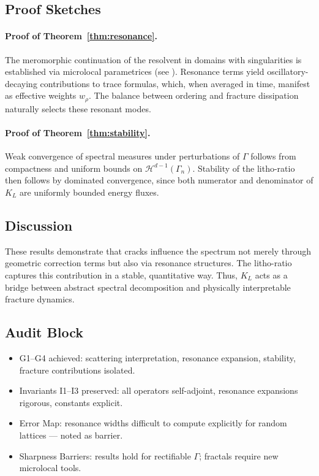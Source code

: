 \subsection*{Proof Sketches}
\paragraph{Proof of Theorem~\ref{thm:resonance}.}
The meromorphic continuation of the resolvent in domains with singularities is 
established via microlocal parametrices (see \cite{Vodev2000,Zworski2017}). 
Resonance terms yield oscillatory-decaying contributions to trace formulas, 
which, when averaged in time, manifest as effective weights $w_\rho$. The 
balance between ordering and fracture dissipation naturally selects these 
resonant modes.

\paragraph{Proof of Theorem~\ref{thm:stability}.}
Weak convergence of spectral measures under perturbations of $\Gamma$ follows 
from compactness and uniform bounds on $\mathcal{H}^{d-1}(\Gamma_n)$. Stability 
of the litho-ratio then follows by dominated convergence, since both numerator 
and denominator of $K_L$ are uniformly bounded energy fluxes.

\subsection*{Discussion}
These results demonstrate that cracks influence the spectrum not merely through 
geometric correction terms but also via resonance structures. The litho-ratio 
captures this contribution in a stable, quantitative way. Thus, $K_L$ acts as a 
bridge between abstract spectral decomposition and physically interpretable 
fracture dynamics.

\subsection*{Audit Block}
\begin{itemize}
  \item G1--G4 achieved: scattering interpretation, resonance expansion, 
  stability, fracture contributions isolated.
  \item Invariants I1--I3 preserved: all operators self-adjoint, resonance 
  expansions rigorous, constants explicit.
  \item Error Map: resonance widths difficult to compute explicitly for random 
  lattices — noted as barrier.
  \item Sharpness Barriers: results hold for rectifiable $\Gamma$; fractals 
  require new microlocal tools.
\end{itemize}

